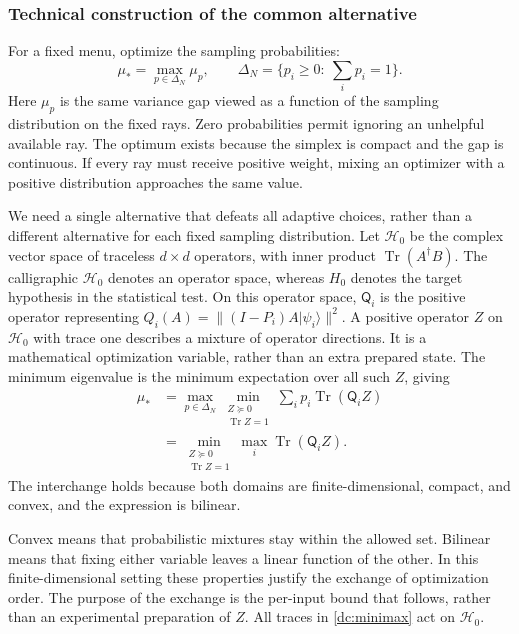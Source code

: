 \documentclass[11pt,a4paper]{article}
\newcommand{\ket}[1]{\lvert #1\rangle}
\newcommand{\Tr}{\operatorname{Tr}}
\numberwithin{equation}{section}
\begin{document}
\subsubsection*{Technical construction of the common alternative}

For a fixed menu, optimize the sampling probabilities:
\[
 \mu_*=\max_{p\in\Delta_N}\mu_p,
 \qquad
 \Delta_N=\{p_i\geq0:\ \sum_i p_i=1\}.
\]
Here $\mu_p$ is the same variance gap viewed as a function of the sampling distribution on the fixed rays. Zero probabilities permit ignoring an unhelpful available ray.  The optimum
exists because the simplex is compact and the gap is continuous.  If every
ray must receive positive weight, mixing an optimizer with a positive
distribution approaches the same value.

We need a single alternative that defeats all adaptive choices, rather than
a different alternative for each fixed sampling distribution.  Let
$\mathcal H_0$ be the complex vector space of traceless $d\times d$
operators, with inner product $\Tr(A^\dagger B)$.  The calligraphic
$\mathcal H_0$ denotes an operator space, whereas $H_0$ denotes the target
hypothesis in the statistical test.  On this operator space,
$\mathsf Q_i$ is the positive operator representing
$Q_i(A)=\|(I-P_i)A\ket{\psi_i}\|^2$.  A positive operator $Z$ on
$\mathcal H_0$ with trace one describes a mixture of operator directions.
It is a mathematical optimization variable, rather than an extra prepared
state.  The minimum eigenvalue is the minimum expectation over all such
$Z$, giving
\begin{align}
 \mu_*
 &=\max_{p\in\Delta_N}\min_{\substack{Z\succeq0\\\Tr Z=1}}
       \sum_i p_i\Tr(\mathsf Q_iZ)\nonumber\\
 &=\min_{\substack{Z\succeq0\\\Tr Z=1}}
       \max_i\Tr(\mathsf Q_iZ).
 \label{dc:minimax}
\end{align}
The interchange holds because both domains are finite-dimensional, compact,
and convex, and the expression is bilinear.

Convex means that probabilistic mixtures stay within the allowed set.
Bilinear means that fixing either variable leaves a linear function of the
other. In this finite-dimensional setting these properties justify the
exchange of optimization order. The purpose of the exchange is the
per-input bound that follows, rather than an experimental preparation of $Z$.  All traces in
\eqref{dc:minimax} act on $\mathcal H_0$.
\end{document}
